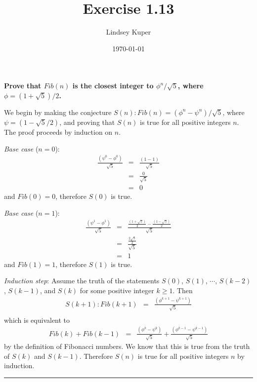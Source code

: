 \documentclass[11pt]{article}
\title{Exercise 1.13}
\author{Lindsey Kuper}
\date{\today}
\newcommand{\statement}[1]{\textbf{#1} \medskip}
\newcommand{\qed}{\hfill \rule{1.3ex}{1.3ex}}
\begin{document}
\maketitle

\statement{Prove that $Fib(n)$ is the closest integer to $\phi^n / \sqrt{5}$, where $\phi = (1 + \sqrt{5}) / 2$.}

We begin by making the conjecture $S(n): Fib(n) = ( \phi^n - \psi^n ) / \sqrt{5}$, where $\psi = (1 - \sqrt{5} / 2)$, and proving that $S(n)$ is true for all positive integers $n$.  The proof proceeds by induction on $n$.

\textit{Base case} ($n = 0$):  
\begin{eqnarray*}
  \frac{\left(\psi^0 - \phi^0\right)}{\sqrt{5}} & = & \frac{\left(1 - 1\right)}{\sqrt{5}} \\
& = & \frac{0}{\sqrt{5}} \\
& = & 0
\end{eqnarray*}
and $Fib(0) = 0$, therefore $S(0)$ is true.

\textit{Base case} ($n = 1$):
\begin{eqnarray*}
  \frac{\left(\psi^1 - \phi^1\right)}{\sqrt{5}} & = & \frac{  
  \frac{\left(1 + \sqrt{5}\right)}{2} -
  \frac{\left(1 - \sqrt{5}\right)}{2}
  }{\sqrt{5}} \\
& = & \frac{
\frac{2\sqrt{5}}{2}
}{\sqrt{5}} \\
& = & 1
\end{eqnarray*}
and $Fib(1) = 1$, therefore $S(1)$ is true.

\textit{Induction step}:  Assume the truth of the statements $S(0)$, $S(1)$, $\cdots$, $S(k-2)$, $S(k-1)$, and $S(k)$ for some positive integer $k \geq 1$.  Then
\begin{eqnarray*}
S(k + 1): Fib(k + 1) & = & \frac{\left(\phi^{k+1} - \psi^{k+1}\right)}{\sqrt{5}} \\
\end{eqnarray*}
which is equivalent to
\begin{eqnarray*}
Fib(k) + Fib(k-1) & = & \frac{\left(\phi^{k} - \psi^{k}\right)}{\sqrt{5}} +  \frac{\left(\phi^{k-1} - \psi^{k-1}\right)}{\sqrt{5}}
\end{eqnarray*}
by the definition of Fibonacci numbers.  
We know that this is true from the truth of $S(k)$ and $S(k -1)$.  Therefore $S(n)$ is true for all positive integers $n$ by induction.\qed
\end{document}
